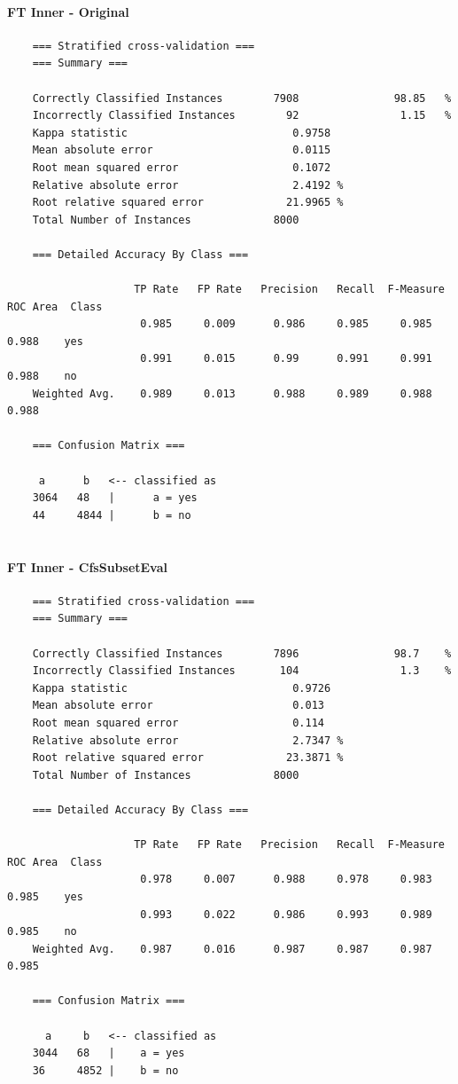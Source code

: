 \paragraph{FT Inner - Original}
{\footnotesize
	\begin{verbatim}
	=== Stratified cross-validation ===
	=== Summary ===
	
	Correctly Classified Instances        7908               98.85   %
	Incorrectly Classified Instances        92                1.15   %
	Kappa statistic                          0.9758
	Mean absolute error                      0.0115
	Root mean squared error                  0.1072
	Relative absolute error                  2.4192 %
	Root relative squared error             21.9965 %
	Total Number of Instances             8000     
	
	=== Detailed Accuracy By Class ===
	
	                TP Rate   FP Rate   Precision   Recall  F-Measure   ROC Area  Class
	                 0.985     0.009      0.986     0.985     0.985      0.988    yes
	                 0.991     0.015      0.99      0.991     0.991      0.988    no
	Weighted Avg.    0.989     0.013      0.988     0.989     0.988      0.988
	
	=== Confusion Matrix ===
	
	 a      b   <-- classified as
	3064   48   |      a = yes
	44     4844 |      b = no
	
	\end{verbatim}
}
\paragraph{FT Inner - CfsSubsetEval}
{\footnotesize
	\begin{verbatim}
	=== Stratified cross-validation ===
	=== Summary ===
	
	Correctly Classified Instances        7896               98.7    %
	Incorrectly Classified Instances       104                1.3    %
	Kappa statistic                          0.9726
	Mean absolute error                      0.013 
	Root mean squared error                  0.114 
	Relative absolute error                  2.7347 %
	Root relative squared error             23.3871 %
	Total Number of Instances             8000     
	
	=== Detailed Accuracy By Class ===
	
	                TP Rate   FP Rate   Precision   Recall  F-Measure   ROC Area  Class
	                 0.978     0.007      0.988     0.978     0.983      0.985    yes
	                 0.993     0.022      0.986     0.993     0.989      0.985    no
	Weighted Avg.    0.987     0.016      0.987     0.987     0.987      0.985
	
	=== Confusion Matrix ===
	
	  a     b   <-- classified as
	3044   68   |    a = yes
	36     4852 |    b = no	
	\end{verbatim}
}
